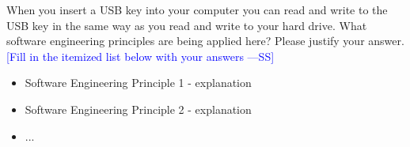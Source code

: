 \documentclass[12pt,fleqn]{examtst}
\newcommand{\authornote}[3]{\textcolor{#1}{[#3 ---#2]}}
\newcommand{\authornote}[3]{}
\newcommand{\wss}[1]{\authornote{blue}{SS}{#1}}
\begin{document}

\newpage

 When you insert a USB key into your computer you can read and
write to the USB key in the same way as you read and write to your hard drive. What
software engineering principles are being applied here? Please justify your
answer.\\

\noindent \wss{Fill in the itemized list below with your answers}

\begin{itemize}
\item Software Engineering Principle 1 - explanation
\item Software Engineering Principle 2 - explanation
\item ...
\end{itemize}


\newpage
\end{document}

